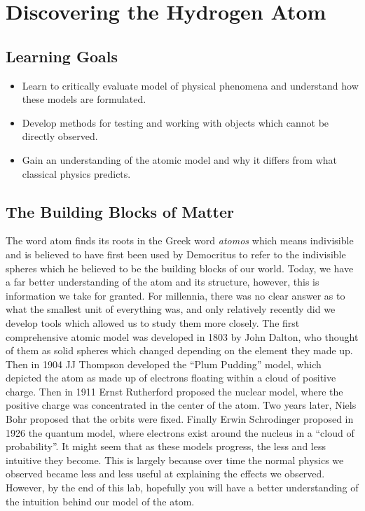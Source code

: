 \chapter{Discovering the Hydrogen Atom}

\section{Learning Goals}

\begin{itemize}
	\item Learn to critically evaluate model of physical phenomena and understand how these models are formulated.
	
	\item Develop methods for testing and working with objects which cannot be directly observed. 
	
	\item Gain an understanding of the atomic model and why it differs from what classical physics predicts.
\end{itemize}

\section{The Building Blocks of Matter}

The word atom finds its roots in the Greek word \textit{atomos} which means indivisible and is believed to have first been used by Democritus to refer to the indivisible spheres which he believed to be the building blocks of our world. Today, we have a far better understanding of the atom and its structure, however, this is information we take for granted. For millennia, there was no clear answer as to what the smallest unit of everything was, and only relatively recently did we develop tools which allowed us to study them more closely. The first comprehensive atomic model was developed in 1803 by John Dalton, who thought of them as solid spheres which changed depending on the element they made up. Then in 1904 JJ Thompson developed the ``Plum Pudding'' model, which depicted the atom as made up of electrons floating within a cloud of positive charge. Then in 1911 Ernst Rutherford proposed the nuclear model, where the positive charge was concentrated in the center of the atom. Two years later, Niels Bohr proposed that the orbits were fixed. Finally Erwin Schrodinger proposed in 1926 the quantum model, where electrons exist around the nucleus in a ``cloud of probability''. It might seem that as these models progress, the less and less intuitive they become. This is largely because over time the normal physics we observed became less and less useful at explaining the effects we observed. However, by the end of this lab, hopefully you will have a better understanding of the intuition behind our model of the atom.  


